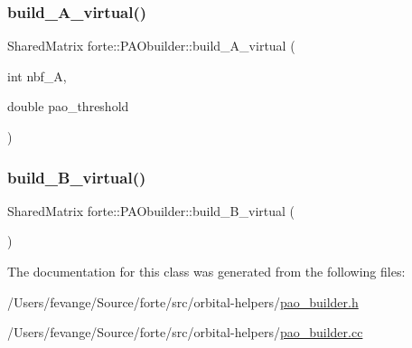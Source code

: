 \subsubsection{\texorpdfstring{build\+\_\+\+A\+\_\+virtual()}{build\_A\_virtual()}}
{\footnotesize\ttfamily Shared\+Matrix forte\+::\+P\+A\+Obuilder\+::build\+\_\+\+A\+\_\+virtual (\begin{DoxyParamCaption}\item[{int}]{nbf\+\_\+A,  }\item[{double}]{pao\+\_\+threshold }\end{DoxyParamCaption})}

\mbox{\label{classforte_1_1_p_a_obuilder_a516283c1ab351c927424b476fdf77f2a}} 
\subsubsection{\texorpdfstring{build\+\_\+\+B\+\_\+virtual()}{build\_B\_virtual()}}
{\footnotesize\ttfamily Shared\+Matrix forte\+::\+P\+A\+Obuilder\+::build\+\_\+\+B\+\_\+virtual (\begin{DoxyParamCaption}{ }\end{DoxyParamCaption})}



The documentation for this class was generated from the following files\+:\begin{DoxyCompactItemize}
\item 
/\+Users/fevange/\+Source/forte/src/orbital-\/helpers/\mbox{\hyperlink{pao__builder_8h}{pao\+\_\+builder.\+h}}\item 
/\+Users/fevange/\+Source/forte/src/orbital-\/helpers/\mbox{\hyperlink{pao__builder_8cc}{pao\+\_\+builder.\+cc}}\end{DoxyCompactItemize}
